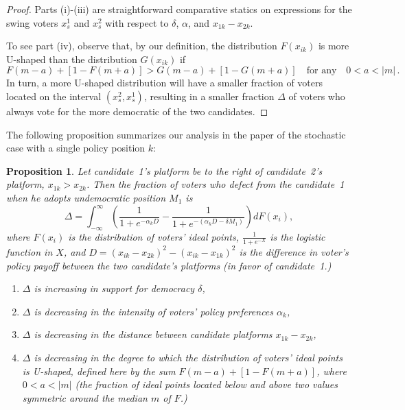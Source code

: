 \documentclass[12pt]{article}
\newtheorem{proposition}{Proposition}
\begin{document}
\begin{proof}
Parts (i)-(iii) are straightforward comparative statics on expressions for the swing voters $x_{s}^1$ and $x_{s}^2$ with respect to $\delta$, $\alpha$, and $x_{1k} - x_{2k}$.

To see part (iv), observe that, by our definition, the distribution $F(x_{ik})$ is more U-shaped than the distribution $G(x_{ik})$ if
\begin{equation*}
F(m-a) + [1-F(m+a)] > G(m-a) + [1-G(m+a)] \quad \text{for any} \quad 0<a<|m| \, .
\end{equation*}
In turn, a more U-shaped distribution will have a smaller fraction of voters located on the interval $(x_{s}^2, x_{s}^1)$, resulting in a smaller fraction $\Delta$ of voters who always vote for the more democratic of the two candidates.
\end{proof}

The following proposition summarizes our analysis in the paper of the stochastic case with a single policy position $k$:
\begin{proposition} \label{prop: case1}
Let candidate~1's platform be to the right of candidate~2's platform, $x_{1k} > x_{2k}$. Then the fraction of voters who defect from the candidate~1 when he adopts undemocratic position $M_1$ is
\begin{equation*}
\Delta = \int_{-\infty}^{\infty} \left(\frac{1}{1+e^{-\alpha_k D}}-\frac{1}{1+e^{-(\alpha_k D - \delta M_1)}}\right) dF(x_i),
\end{equation*}
where $F(x_i)$ is the distribution of voters' ideal points, $\frac{1}{1+e^{-X}}$ is the logistic function in $X$, and $D= (x_{ik} - x_{2k})^2 - (x_{ik} - x_{1k})^2$ is the difference in voter's policy payoff between the two candidate's platforms (in favor of candidate~1.)

\renewcommand{\labelenumi}{(\roman{enumi})}
\begin{enumerate}
\item $\Delta$ is increasing in support for democracy $\delta$,
\item $\Delta$ is decreasing in the intensity of voters' policy preferences $\alpha_k$,
\item $\Delta$ is decreasing in the distance between candidate platforms $x_{1k} - x_{2k}$,
\item $\Delta$ is decreasing in the degree to which the distribution of voters' ideal points is U-shaped, defined here by the sum $F(m-a) + [1-F(m+a)]$, where $0<a<|m|$ (the fraction of ideal points located below and above two values symmetric around the median $m$ of $F$.)
\end{enumerate}
\end{proposition}
\end{document}
